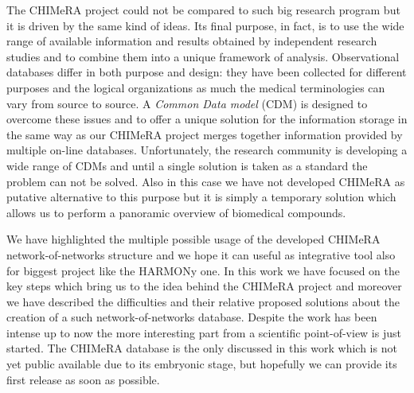 \documentclass{standalone}
\begin{document}
The \textsf{CHIMeRA} project could not be compared to such big research program but it is driven by the same kind of ideas.
Its final purpose, in fact, is to use the wide range of available information and results obtained by independent research studies and to combine them into a unique framework of analysis.
Observational databases differ in both purpose and design: they have been collected for different purposes and the logical organizations as much the medical terminologies can vary from source to source.
A \emph{Common Data model} (CDM) is designed to overcome these issues and to offer a unique solution for the information storage in the same way as our \textsf{CHIMeRA} project merges together information provided by multiple on-line databases.
Unfortunately, the research community is developing a wide range of CDMs and until a single solution is taken as a standard the problem can not be solved.
Also in this case we have not developed \textsf{CHIMeRA} as putative alternative to this purpose but it is simply a temporary solution which allows us to perform a panoramic overview of biomedical compounds.

We have highlighted the multiple possible usage of the developed \textsf{CHIMeRA} network-of-networks structure and we hope it can useful as integrative tool also for biggest project like the HARMONy one.
In this work we have focused on the key steps which bring us to the idea behind the \textsf{CHIMeRA} project and moreover we have described the difficulties and their relative proposed solutions about the creation of a such network-of-networks database.
Despite the work has been intense up to now the more interesting part from a scientific point-of-view is just started.
The \textsf{CHIMeRA} database is the only  discussed in this work which is not yet public available due to its embryonic stage, but hopefully we can provide its first release as soon as possible.
\end{document}

